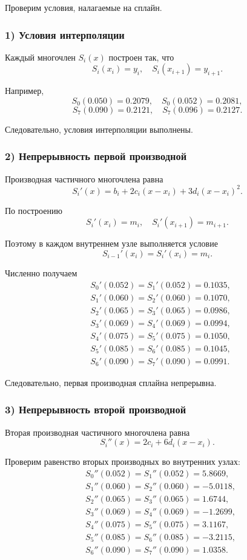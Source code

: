 Проверим условия, налагаемые на сплайн.

\subsubsection*{1) Условия интерполяции}

Каждый многочлен $S_i(x)$ построен так, что
\[
S_i(x_i)=y_i, \quad S_i(x_{i+1})=y_{i+1}.
\]

Например,
\[
S_0(0.050)=0.2079, \quad S_0(0.052)=0.2081,
\]
\[
S_7(0.090)=0.2121, \quad S_7(0.096)=0.2127.
\]

Следовательно, условия интерполяции выполнены.

\subsubsection*{2) Непрерывность первой производной}

Производная частичного многочлена равна
\[
S_i'(x)=b_i+2c_i(x-x_i)+3d_i(x-x_i)^2.
\]

По построению
\[
S_i'(x_i)=m_i, \quad S_i'(x_{i+1})=m_{i+1}.
\]

Поэтому в каждом внутреннем узле выполняется условие
\[
S_{i-1}'(x_i)=S_i'(x_i)=m_i.
\]

Численно получаем
\[
\begin{aligned}
&S_0'(0.052)=S_1'(0.052)=0.1035,\\
&S_1'(0.060)=S_2'(0.060)=0.1070,\\
&S_2'(0.065)=S_3'(0.065)=0.0986,\\
&S_3'(0.069)=S_4'(0.069)=0.0994,\\
&S_4'(0.075)=S_5'(0.075)=0.1050,\\
&S_5'(0.085)=S_6'(0.085)=0.1045,\\
&S_6'(0.090)=S_7'(0.090)=0.0991.
\end{aligned}
\]

Следовательно, первая производная сплайна непрерывна.

\subsubsection*{3) Непрерывность второй производной}

Вторая производная частичного многочлена равна
\[
S_i''(x)=2c_i+6d_i(x-x_i).
\]

Проверим равенство вторых производных во внутренних узлах:
\[
\begin{aligned}
&S_0''(0.052)=S_1''(0.052)=5.8669,\\
&S_1''(0.060)=S_2''(0.060)=-5.0118,\\
&S_2''(0.065)=S_3''(0.065)=1.6744,\\
&S_3''(0.069)=S_4''(0.069)=-1.2699,\\
&S_4''(0.075)=S_5''(0.075)=3.1167,\\
&S_5''(0.085)=S_6''(0.085)=-3.2115,\\
&S_6''(0.090)=S_7''(0.090)=1.0358.
\end{aligned}
\]

